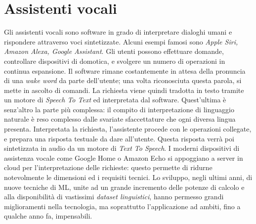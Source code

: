 \section{Assistenti vocali}
\label{section:vocal_assistants}
Gli assistenti vocali sono software in grado di interpretare dialoghi umani e rispondere attraverso voci sintetizzate. Alcuni esempi famosi sono \textit{Apple Siri, Amazon Alexa, Google Assistant}. Gli utenti possono effettuare domande, controllare dispositivi di domotica, e svolgere un numero di operazioni in continua espansione\cite{article:introduction_to_va}. Il software rimane costantemente in attesa della pronuncia di una \textit{wake word} da parte dell'utente; una volta riconosciuta questa parola, si mette in ascolto di comandi. La richiesta viene quindi tradotta in testo tramite un motore di \textit{Speech To Text} ed interpretata dal software. Quest'ultima è senz'altro la parte più complessa: il compito di interpretazione di linguaggio naturale è reso complesso dalle svariate sfaccettature che ogni diversa lingua presenta. Interpretata la richiesta, l'assistente procede con le operazioni collegate, e prepara una risposta testuale da dare all'utente. Questa risposta verrà poi sintetizzata in audio da un motore di \textit{Text To Speech}. I moderni dispositivi di assistenza vocale come Google Home o Amazon Echo si appoggiano a server in cloud per l'interpretazione delle richieste: questo permette di ridurne notevolmente le dimensioni ed i requisiti tecnici.
Lo sviluppo, negli ultimi anni, di nuove tecniche di ML, unite ad un grande incremento delle potenze di calcolo e alla disponibilità di vastissimi \textit{dataset linguistici}, hanno permesso grandi miglioramenti nella tecnologia, ma soprattutto l'applicazione ad ambiti, fino a qualche anno fa, impensabili.
